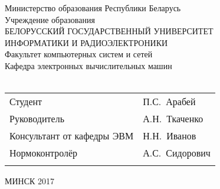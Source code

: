 \begin{titlepage}
  \begin{center}
    Министерство образования Республики Беларусь\\[1em]
    Учреждение образования\\
    БЕЛОРУССКИЙ ГОСУДАРСТВЕННЫЙ УНИВЕРСИТЕТ \\
    ИНФОРМАТИКИ И РАДИОЭЛЕКТРОНИКИ\\[1em]

    Факультет компьютерных систем и сетей \\[0.6cm]

    Кафедра электронных вычислительных машин \\[2.5cm]


        {} \\[4cm]

        \noindent
        \begin{tabular}{ p{}p{} }
          Студент & П.С.~Арабей \\[1em]

          Руководитель & А.Н.~Ткаченко \\[1em]

          Консультант от кафедры ЭВМ & Н.Н.~Иванов \\[1em]


          Нормоконтролёр & А.С.~Сидорович\\[1em]
          & \\

        \end{tabular}

        \vfill

        {\normalsize МИНСК 2017}
    \end{center}

\end{titlepage}
